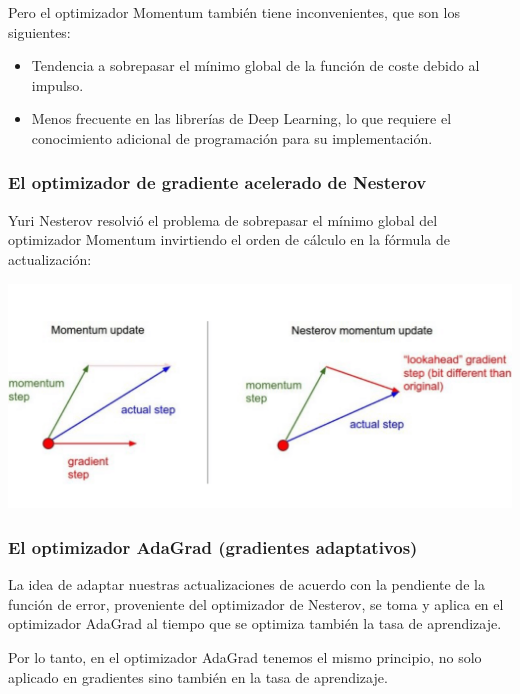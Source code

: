 \documentclass[
]{book}
\providecommand{\tightlist}{%
  \setlength{\itemsep}{0pt}\setlength{\parskip}{0pt}}
\begin{document}
Pero el optimizador Momentum también tiene inconvenientes, que son los siguientes:

\begin{itemize}
\tightlist
\item
  Tendencia a sobrepasar el mínimo global de la función de coste debido al impulso.
\item
  Menos frecuente en las librerías de Deep Learning, lo que requiere el conocimiento adicional de programación para su implementación.
\end{itemize}

\hypertarget{el-optimizador-de-gradiente-acelerado-de-nesterov}{%
\subsubsection{El optimizador de gradiente acelerado de Nesterov}\label{el-optimizador-de-gradiente-acelerado-de-nesterov}}

Yuri Nesterov resolvió el problema de sobrepasar el mínimo global del optimizador Momentum invirtiendo el orden de cálculo en la fórmula de actualización:

\includegraphics{Images/ANN_33.png}

\hypertarget{el-optimizador-adagrad-gradientes-adaptativos}{%
\subsubsection{El optimizador AdaGrad (gradientes adaptativos)}\label{el-optimizador-adagrad-gradientes-adaptativos}}

La idea de adaptar nuestras actualizaciones de acuerdo con la pendiente de la función de error, proveniente del optimizador de Nesterov, se toma y aplica en el optimizador AdaGrad al tiempo que se optimiza también la tasa de aprendizaje.

Por lo tanto, en el optimizador AdaGrad tenemos el mismo principio, no solo aplicado en gradientes sino también en la tasa de aprendizaje.
\end{document}
